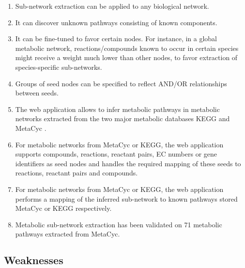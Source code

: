 \begin{enumerate}
\item Sub-network extraction can be applied to any biological network.

\item It can discover unknown pathways consisting of known components.

\item It can be fine-tuned to favor certain nodes. For instance, in a global metabolic network,
      reactions/compounds known to occur in certain species might receive a weight much lower than other nodes,
      to favor extraction of species-specific sub-networks.

\item Groups of seed nodes can be specified to reflect AND/OR relationships between seeds.

\item The web application allows to infer metabolic pathways
      in metabolic networks extracted from the two major metabolic
      databases KEGG \cite{Kanehisa2008} and MetaCyc \cite{biocyc}.

\item For metabolic networks from MetaCyc or KEGG, the web application supports compounds, reactions, reactant pairs, EC numbers or gene identifiers
      as seed nodes and handles the required mapping of these seeds to reactions, reactant pairs and compounds.

\item For metabolic networks from MetaCyc or KEGG, the web application performs a
      mapping of the inferred sub-network to known pathways stored MetaCyc or KEGG respectively.

\item Metabolic sub-network extraction has been validated on 71 metabolic pathways extracted from MetaCyc.
\end{enumerate}

\subsection{Weaknesses}

